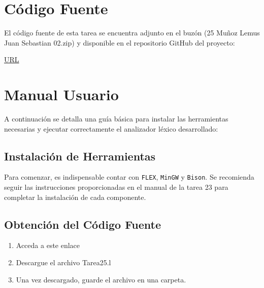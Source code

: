 \documentclass{article}
\begin{document}

\section{Código Fuente}\label{sec:cod}

El código fuente de esta tarea se encuentra adjunto en el buzón 
(25 Muñoz Lemus Juan Sebastian 02.zip)
y disponible en el repositorio GitHub del proyecto:

\begin{center}
\url{URL}
\end{center}


\section{Manual Usuario}\label{sec:man_u}

A continuación se detalla una guía básica para instalar las herramientas necesarias y ejecutar correctamente el analizador léxico desarrollado:

\subsection*{Instalación de Herramientas}

Para comenzar, es indispensable contar con \texttt{FLEX}, \texttt{MinGW} y \texttt{Bison}. Se recomienda seguir las instrucciones proporcionadas en el manual de la tarea 23 para completar la instalación de cada componente.

\subsection*{Obtención del Código Fuente}

\begin{enumerate}
    \item Acceda a este enlace
    \item Descargue el archivo Tarea25.l
    \item Una vez descargado, guarde el archivo en una carpeta.
\end{enumerate}
\end{document}
